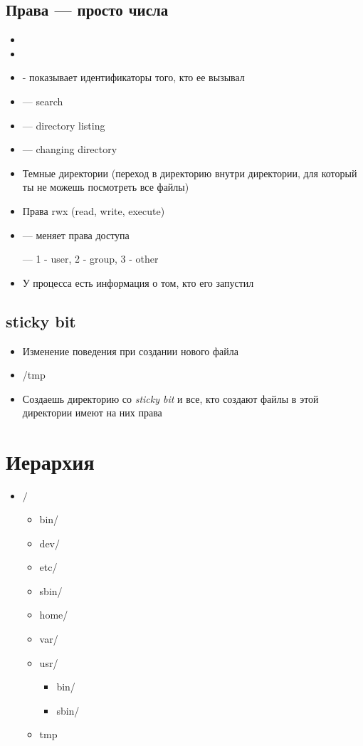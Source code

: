 \documentclass[../../lectures.tex]{subfiles}
\begin{document}
\subsection{Права --- просто числа}
\begin{itemize}
    \item {}
    \item {}
    \item {} - показывает идентификаторы того, кто ее вызывал
    \item {} --- search
    \item {} --- directory listing
    \item {} --- changing directory
    \item Темные директории (переход в директорию внутри директории, для который ты не можешь посмотреть все файлы)
    \item Права rwx (read, write, execute)
    \item {} --- меняет права доступа
          
           --- 1 - user, 2 - group, 3 - other
    \item У процесса есть информация о том, кто его запустил
\end{itemize}
\subsection{sticky bit}
\begin{itemize}
    \item Изменение поведения при создании нового файла
    \item /tmp
    \item Создаешь директорию со \emph{sticky bit} и все, кто создают файлы в этой директории имеют на них права
\end{itemize}

\section{Иерархия}
\begin{itemize}
    \item $/$
        \begin{itemize}
            \item bin/
            \item dev/
            \item etc/
            \item sbin/
            \item home/
            \item var/
            \item usr/
                \begin{itemize}
                    \item bin/
                    \item sbin/
                \end{itemize}
            \item tmp
        \end{itemize}
\end{itemize}
\end{document}
